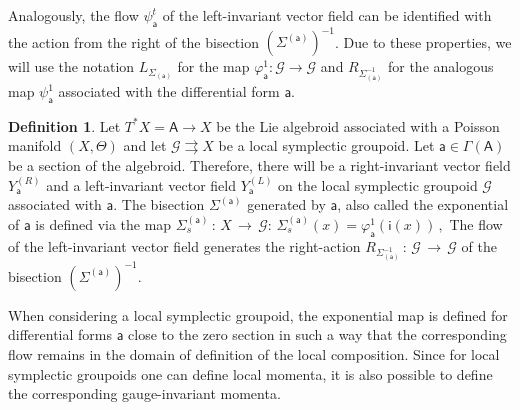 \documentclass[12pt,a4paper]{article}
\numberwithin{equation}{section}
\theoremstyle{definition}
\newtheorem{definition}[equation]{Definition}
\newcommand{\cG}{\mathcal{G}}
\newcommand{\sfi}{\mathsf{i}}
\newcommand{\sfa}{\mathsf{a}}
\newcommand{\sfA}{\mathsf{A}}
\begin{document}
 Analogously, the flow $\psi^t_{\sfa}$ of the left-invariant vector field can be identified with the action from the right of the bisection $\left( \Sigma^{({\sfa})} \right)^{-1}$. Due to these properties, we will use the notation $L_{\Sigma_{({\sfa})}}$ for the map $\varphi^1_{\sfa}\colon \cG\rightarrow \cG $ and $R_{\Sigma^{-1}_{({\sfa})}}$ for the analogous map $\psi^1_{\sfa}$ associated with the differential form ${\sfa}$. 
\begin{definition}
    Let $T^*X=\sfA \rightarrow X$ be the Lie algebroid associated with a Poisson manifold $(X,\Theta)$ and let $\cG\rightrightarrows X$ be a local symplectic groupoid. Let $\sfa\in \Gamma(\sfA)$ be a section of the algebroid. Therefore, there will be a right-invariant vector field $Y^{(R)}_{\sfa}$ and a left-invariant vector field $Y^{(L)}_{\sfa}$ on the local symplectic groupoid $\cG$ associated with $\sfa$. The bisection $\Sigma^{(\sfa)}$ generated by $\sfa$, also called the exponential of $\sfa$ is defined via the map $\Sigma^{({\sfa})}_s\,\colon\,X\,\rightarrow\,\cG$:
    $
    \Sigma^{({\sfa})}_s(x) = \varphi^1_{\sfa} (\sfi(x))\,,
    $
    The flow of the left-invariant vector field generates the right-action 
    $
    R_{\Sigma_{(\sfa)}^{-1}}\,\colon\,\cG\,\rightarrow\,\cG
    $
    of the bisection $(\Sigma^{(\sfa)})^{-1}$.
\end{definition}

When considering a local symplectic groupoid, the exponential map is defined for differential forms ${\sfa}$ close to the zero section in such a way that the corresponding flow remains in the domain of definition of the local composition. Since for local symplectic groupoids one can define local momenta, it is also possible to define the corresponding gauge-invariant momenta. 
\end{document}

